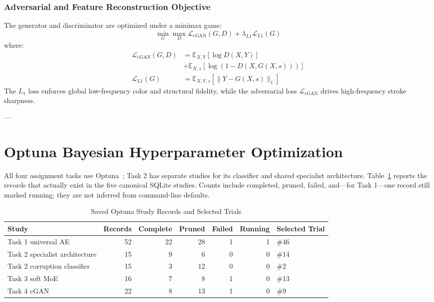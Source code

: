 \documentclass[journal,compsoc]{IEEEtran}
\begin{document}
\subsubsection{Adversarial and Feature Reconstruction Objective}
The generator and discriminator are optimized under a minimax game:
\begin{equation}
    \min_G \max_D \mathcal{L}_{\text{cGAN}}(G, D) + \lambda_{L1} \mathcal{L}_{L1}(G)
\end{equation}
where:
\begin{align}
    \mathcal{L}_{\text{cGAN}}(G, D) &= \mathbb{E}_{X, Y}[\log D(X, Y)] \nonumber \\
    &+ \mathbb{E}_{X, s}[\log (1 - D(X, G(X, s)))] \\
    \mathcal{L}_{L1}(G) &= \mathbb{E}_{X, Y, s}[\|Y - G(X, s)\|_1]
\end{align}
The $L_1$ loss enforces global low-frequency color and structural fidelity, while the adversarial loss $\mathcal{L}_{\text{cGAN}}$ drives high-frequency stroke sharpness.

---

\section{Optuna Bayesian Hyperparameter Optimization}
\label{sec:optuna}

All four assignment tasks use Optuna~\cite{akiba2019optuna}; Task 2 has separate studies for its classifier and shared specialist architecture. Table~\ref{tab:optuna_trial_inventory} reports the records that actually exist in the five canonical SQLite studies. Counts include completed, pruned, failed, and---for Task 1---one record still marked running; they are not inferred from command-line defaults.

\begin{table}[!t]
\caption{Saved Optuna Study Records and Selected Trials}
\label{tab:optuna_trial_inventory}
\centering
\begin{tabular}{lrrrrrl}
\toprule
\textbf{Study} & \textbf{Records} & \textbf{Complete} & \textbf{Pruned} & \textbf{Failed} & \textbf{Running} & \textbf{Selected Trial} \\
\midrule
Task 1 universal AE & 52 & 22 & 28 & 1 & 1 & \#46 \\
Task 2 specialist architecture & 15 & 9 & 6 & 0 & 0 & \#14 \\
Task 2 corruption classifier & 15 & 3 & 12 & 0 & 0 & \#2 \\
Task 3 soft MoE & 16 & 7 & 8 & 1 & 0 & \#13 \\
Task 4 cGAN & 22 & 8 & 13 & 1 & 0 & \#9 \\
\bottomrule
\end{tabular}
\end{table}
\end{document}
